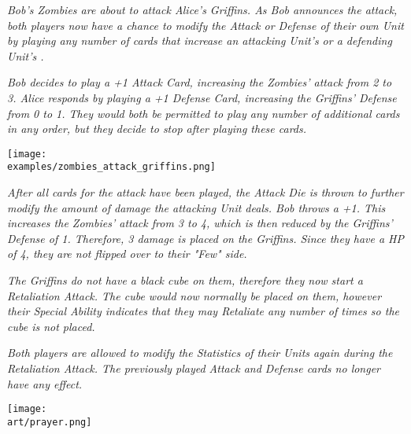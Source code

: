 \begin{multicols*}{2}
\textit{Bob's Zombies are about to attack Alice's Griffins.
As Bob announces the attack, both players now have a chance to modify the Attack or Defense of their own Unit by playing any number of  cards that increase an attacking Unit's  or a defending Unit's .}\par
\textit{Bob decides to play a +1 Attack Card, increasing the Zombies' attack from 2 to 3.
Alice responds by playing a +1 Defense Card, increasing the Griffins' Defense from 0 to 1.
They would both be permitted to play any number of additional cards in any order, but they decide to stop after playing these cards.}\par

\texttt{[image: \\examples/zombies\_attack\_griffins.png]}

\textit{After all cards for the attack have been played, the Attack Die is thrown to further modify the amount of damage the attacking Unit deals.
Bob throws a +1.
This increases the Zombies' attack from 3 to 4, which is then reduced by the Griffins' Defense of 1. Therefore, 3 damage  is placed on the Griffins. Since they have a HP  of 4, they are not flipped over to their "Few" side.}\par
\textit{The Griffins do not have a black cube on them, therefore they now start a Retaliation Attack.
The cube would now normally be placed on them, however their Special  Ability indicates that they may Retaliate any number of times so the cube is not placed.}\par
\textit{Both players are allowed to modify the Statistics of their Units again during the Retaliation Attack.
The previously played Attack and Defense cards no longer have any effect.}

\vfill

\texttt{[image: \\art/prayer.png]}

\end{multicols*}
